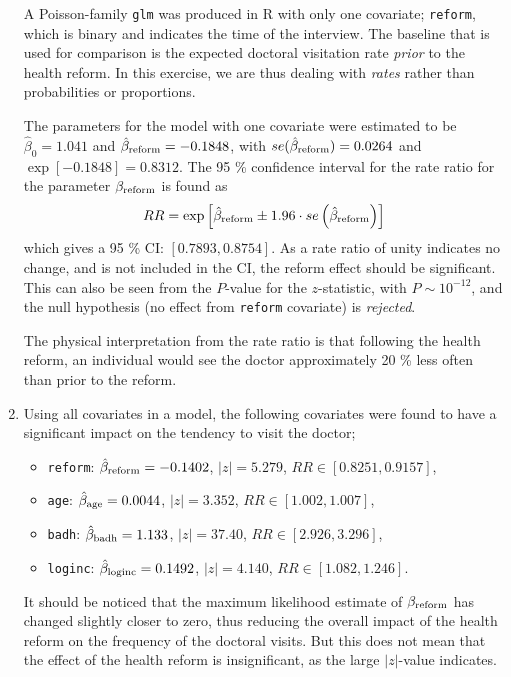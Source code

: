 \documentclass[a4paper,11pt]{article}
\begin{document}
\begin{enumerate}[label=2\alph*)]
        A Poisson-family \texttt{glm} was produced in R with only one covariate; \texttt{reform}, which is binary and indicates the time of the interview. The baseline that is used for comparison is the expected doctoral visitation rate \textit{prior} to the health reform. In this exercise, we are thus dealing with \textit{rates} rather than probabilities or proportions.

        The parameters for the model with one covariate were estimated to be $\hat{\beta}_0 = 1.041$ and $\hat{\beta}_{\rm reform} = -0.1848$, with $se(\hat{\beta}_{\rm reform}) = 0.0264$ and $\exp\left[ -0.1848 \right] = 0.8312$. The 95 \% confidence interval for the rate ratio for the parameter $\beta_{\rm reform}$ is found as
        \begin{equation}
            RR = \exp \left[ \hat{\beta}_{\rm reform} \pm 1.96 \cdot se\left( \hat{\beta}_{\rm reform} \right) \right]
            \label{eq:rate_ratio_CI}
        \end{equation}
        which gives a 95 \% CI: $[0.7893, 0.8754]$. As a rate ratio of unity indicates no change, and is not included in the CI, the reform effect should be significant. This can also be seen from the $P$-value for the $z$-statistic, with $P\sim 10^{-12}$, and the null hypothesis (no effect from \texttt{reform} covariate) is \textit{rejected}. 

        The physical interpretation from the rate ratio is that following the health reform, an individual would see the doctor approximately 20 \% less often than prior to the reform. 

    \item Using all covariates in a model, the following covariates were found to have a significant impact on the tendency to visit the doctor;
        \begin{itemize}
            \item \texttt{reform}: $\hat{\beta}_{\rm reform} = -0.1402$, $|z| = 5.279$, $RR \in [0.8251, 0.9157]$,
            \item \texttt{age}: $\hat{\beta}_{\rm age} = 0.0044$, $|z| = 3.352$, $RR \in [1.002, 1.007]$, 
            \item \texttt{badh}: $\hat{\beta}_{\rm badh} = 1.133$, $|z| = 37.40$, $RR \in [2.926, 3.296]$,
            \item \texttt{loginc}: $\hat{\beta}_{\rm loginc} = 0.1492$, $|z| = 4.140$, $RR \in [1.082, 1.246]$.
        \end{itemize}

        It should be noticed that the maximum likelihood estimate of $\beta_{\rm reform}$ has changed slightly closer to zero, thus reducing the overall impact of the health reform on the frequency of the doctoral visits. But this does not mean that the effect of the health reform is insignificant, as the large $|z|$-value indicates. 
        

\end{enumerate}
\end{document}
